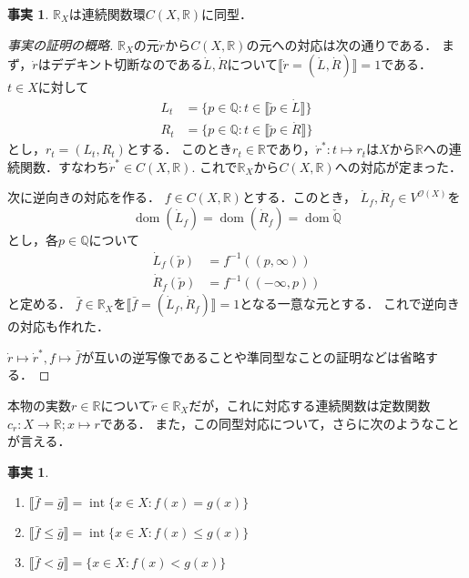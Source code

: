 \documentclass[uplatex,dvipdfmx]{jsarticle}
\newcommand{\Q}{\mathbb{Q}}
\newcommand{\R}{\mathbb{R}}
\newcommand{\dom}{\operatorname{dom}}
\newcommand{\intr}{\operatorname{int}}
\newcommand{\truth}[1] {\llbracket #1 \rrbracket}
\theoremstyle{definition}
\newtheorem{fact}[thm]{事実}
\begin{document}
\begin{fact}
$\R_X$は連続関数環$C(X, \R)$に同型．
\end{fact}
\begin{proof}[事実の証明の概略]
$\R_X$の元$\dot{r}$から$C(X, \R)$の元への対応は次の通りである．
まず，$\dot{r}$はデデキント切断なのである$\dot{L}, \dot{R}$について$\truth{\dot{r} = (\dot{L}, \dot{R})} = 1$である．
$t \in X$に対して
\begin{align*}
L_t &= \{ p \in \Q : t \in \truth{\check{p} \in \dot{L}} \} \\
R_t &= \{ p \in \Q : t \in \truth{\check{p} \in \dot{R}} \}
\end{align*}
とし，$r_t = (L_t, R_t)$とする．
このとき$r_t \in \R$であり，$\dot{r}^*: t \mapsto r_t$は$X$から$\R$への連続関数．すなわち$\dot{r}^* \in C(X, \R)$.
これで$\R_X$から$C(X, \R)$への対応が定まった．

次に逆向きの対応を作る．
$f \in C(X, \R)$とする．このとき，
$\dot{L}_f, \dot{R}_f \in V^{\mathcal{O}(X)}$を
\[
\dom(\dot{L}_f) = \dom(\dot{R}_f) = \dom \check{\Q}
\]
とし，各$p \in \Q$について
\begin{align*}
\dot{L}_f(\check{p}) &= f^{-1}((p, \infty)) \\
\dot{R}_f(\check{p}) &= f^{-1}((-\infty, p))
\end{align*}
と定める．
$\bar{f} \in \R_X$を$\truth{\bar{f} = (\dot{L}_f, \dot{R}_f)} = 1$となる一意な元とする．
これで逆向きの対応も作れた．

$\dot{r} \mapsto \dot{r}^*, f \mapsto \bar{f}$が互いの逆写像であることや準同型なことの証明などは省略する．
\end{proof}

本物の実数$r \in \R$について$\check{r} \in \R_X$だが，これに対応する連続関数は定数関数$c_r : X \to \R; x \mapsto r$である．
また，この同型対応について，さらに次のようなことが言える．

\begin{fact}
\begin{enumerate}
\item $\truth{\bar{f} = \bar{g}} = \intr \{ x \in X : f(x) = g(x) \}$
\item $\truth{\bar{f} \le \bar{g}} = \intr \{ x \in X : f(x) \le g(x) \}$
\item $\truth{\bar{f} < \bar{g}} = \{ x \in X : f(x) < g(x) \}$
\end{enumerate}
\end{fact}
\end{document}
